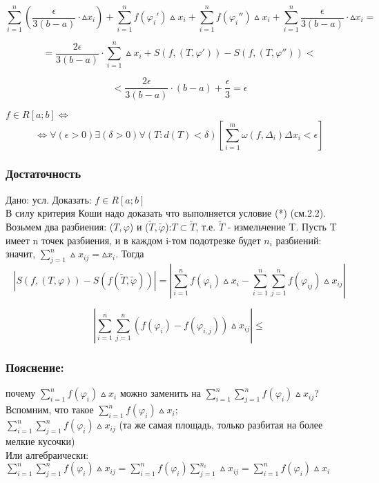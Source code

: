 $$
\sum_{i=1}^{n}(\frac{\epsilon}{3(b-a)}\cdot\vartriangle x_i) + \sum_{i=1}^{n}f(\varphi_i')\vartriangle x_i + \sum_{i=1}^{n}f(\varphi_i'')\vartriangle x_i + \sum_{i=1}^{n}\frac{\epsilon}{3(b-a)}\cdot \vartriangle x_i =
$$

$$
=\frac{2\epsilon}{3(b-a)}\cdot\sum_{i=1}^{n}\vartriangle x_i + S(f,(T,\varphi')) - S(f,(T,\varphi''))<
$$

$$
<\frac{2\epsilon}{3(b-a)}\cdot (b-a) + \frac{\epsilon}{3}=\epsilon
$$
\dokno

\begin{teorema}
$f\in R[a;b] \Leftrightarrow$
\begin{equation}\label{nid_usl_int_koleb}
	\Leftrightarrow \forall(\epsilon>0)\exists(\delta>0)\forall(T:d(T)<\delta)
	\left[\sum_{i=1}^m\omega(f,\Delta_i) \Delta x_i <\epsilon\right]
\end{equation}
\end{teorema}

\dokvo

\subsubsection{Достаточность}
Дано: усл. Доказать: $f\in R[a;b]$
\\
В силу критерия Коши надо доказать что выполняется условие (*) (см.2.2).
\\
Возьмем два разбиения: ($T,\varphi$) и ($\tilde{T},\tilde{\varphi}$):$T \subset \tilde{T}$, т.е. $\tilde{T}$ - измельчение T. Пусть T имеет n  точек разбиения, и в каждом i-том подотрезке будет $n_i$ разбиений: значит, $\sum_{j=1}^{n}\vartriangle x_{ij}=\vartriangle x_i.$ Тогда
$$
|S(f,(T,\varphi))-S(f(\tilde{T},\tilde{\varphi}))|=|\sum_{i=1}^{n}f(\varphi_i)\vartriangle x_i - \sum_{i=1}^{n}\sum_{j=1}^{n}f(\varphi_{ij})\vartriangle x_{ij}|
$$

$$
|\sum_{i=1}^{n}\sum_{j=1}^{n}(f(\varphi_i)-f(\varphi_{i,j}))\vartriangle x_{ij}|\leq
$$

\subsubsection{Пояснение:}
почему $\sum_{i=1}^{n}f(\varphi_i)\vartriangle x_i$ можно заменить на $\sum_{i=1}^{n}\sum_{j=1}^{n}f(\varphi_{i})\vartriangle x_{ij}$?
\\
Вспомним, что такое $\sum_{i=1}^{n}f(\varphi_i)\vartriangle x_i$;
\\
$\sum_{i=1}^{n}\sum_{j=1}^{n}f(\varphi_{i})\vartriangle x_{ij}$
(та же самая площадь, только разбитая на более мелкие кусочки)
\\
Или алгебраически:
$\sum_{i=1}^{n}\sum_{j=1}^{n}f(\varphi_{i})\vartriangle x_{ij} = \sum_{i=1}^{n}f(\varphi_i)\sum_{j=1}^{n_i}\vartriangle x_{ij}=\sum_{i=1}^{n}f(\varphi_i)\vartriangle x_i$

